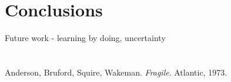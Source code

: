 \documentclass[singlespace]{easychithesis}
\begin{document}
\chapter{Conclusions}

Future work - learning by doing, uncertainty


%
%
\appendix
\chapter{}

\chapter{}



\singlespacing
\pagebreak
{}

\begin{thebibliography}{99}
Anderson, Bruford, Squire, Wakeman.  \emph{Fragile}.
  Atlantic, 1973.
\end{thebibliography}
\end{document}
